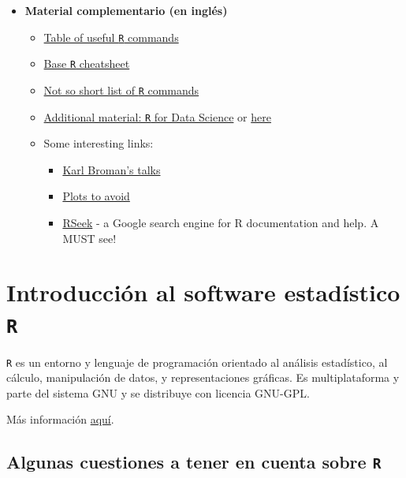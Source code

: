 \documentclass[]{book}
\begin{document}
\begin{itemize}
\item
  \textbf{Material complementario (en inglés)}

  \begin{itemize}
  \item
    \href{https://www.calvin.edu/~scofield/courses/m143/materials/RcmdsFromClass.pdf}{Table
    of useful \texttt{R} commands}
  \item
    \href{https://www.rstudio.com/wp-content/uploads/2016/10/r-cheat-sheet-3.pdf}{Base
    \texttt{R} cheatsheet}
  \item
    \href{http://www.webpages.uidaho.edu/~stevel/251/comR.pdf}{Not so
    short list of \texttt{R} commands}
  \item
    \href{http://r4ds.had.co.nz/}{Additional material: \texttt{R} for
    Data Science} or \href{http://courses.had.co.nz/}{here}
  \item
    Some interesting links:

    \begin{itemize}
    \item
      \href{http://kbroman.org/pages/talks.html}{Karl Broman's talks}
    \item
      \href{http://genomicsclass.github.io/book/pages/plots_to_avoid.html}{Plots
      to avoid}
    \item
      \href{http://rseek.org/}{RSeek} - a Google search engine for R
      documentation and help. A MUST see!
    \end{itemize}
  \end{itemize}
\end{itemize}

\chapter{\texorpdfstring{Introducción al software estadístico
\texttt{R}}{Introducción al software estadístico R}}\label{intro}

\texttt{R} es un entorno y lenguaje de programación orientado al
análisis estadístico, al cálculo, manipulación de datos, y
representaciones gráficas. Es multiplataforma y parte del sistema GNU y
se distribuye con licencia GNU-GPL.

Más información
\href{https://es.wikipedia.org/wiki/R_(lenguaje_de_programaci\%C3\%B3n)}{aquí}.
~

\section{\texorpdfstring{Algunas cuestiones a tener en cuenta sobre
\texttt{R}}{Algunas cuestiones a tener en cuenta sobre R}}\label{algunas-cuestiones-a-tener-en-cuenta-sobre-r}
\end{document}
